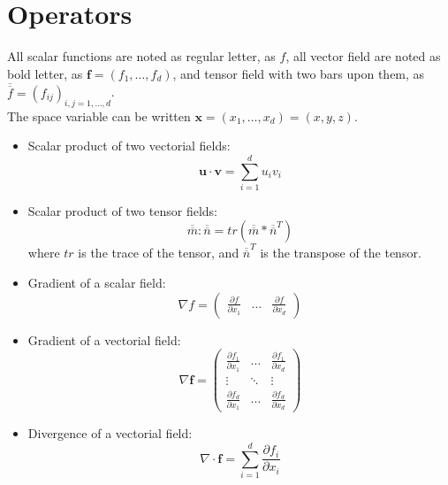 \documentclass{article}
\begin{document}
\section{Operators}
All scalar functions are noted as regular letter, as $f$, all vector field are
noted as bold letter, as $\mathbf{f}=(f_1,\dots,f_d)$, and tensor field with two
bars upon them, as $\overline{\overline{f}}=(f_{ij})_{i,j=1,\dots,d}$.\\
The space variable can be written $\mathbf{x}=(x_1,\dots,x_d)=(x,y,z)$.

\begin{itemize}
\item
  Scalar product of two vectorial fields:
  \begin{equation*}
    \mathbf{u}\cdot\mathbf{v} = \sum_{i=1}^d u_i v_i
  \end{equation*}
\item
  Scalar product of two tensor fields:
  \begin{equation*}
    \overline{\overline{m}}:\overline{\overline{n}} =
    tr(\overline{\overline{m}}*\overline{\overline{n}}^T)
  \end{equation*}
  where $tr$ is the trace of the tensor, and $\overline{\overline{n}}^T$ is the
  transpose of the tensor.
\item
  Gradient of a scalar field:
  \begin{equation*}
    \nabla f =
    \begin{pmatrix}
      \frac{\partial f}{\partial x_1}
      & \dots
      & \frac{\partial f}{\partial x_d}
    \end{pmatrix}
  \end{equation*}
\item
  Gradient of a vectorial field:
  \begin{equation*}
    \nabla \mathbf{f} =
    \begin{pmatrix}
      \frac{\partial f_1}{\partial x_1} &
      \dots &
      \frac{\partial f_1}{\partial x_d} \\
      \vdots & \ddots & \vdots \\
      \frac{\partial f_d}{\partial x_1} &
      \dots &
      \frac{\partial f_d}{\partial x_d}
    \end{pmatrix}
  \end{equation*}
\item
  Divergence of a vectorial field:
  \begin{equation*}
    \nabla\cdot\mathbf{f} =
    \sum_{i=1}^d \frac{\partial f_i}{\partial x_i}
  \end{equation*}

\end{itemize}
\end{document}
